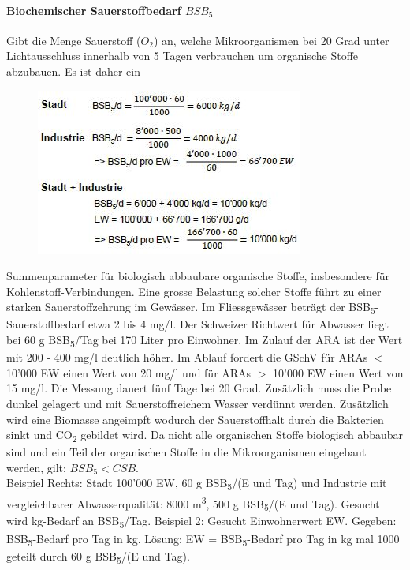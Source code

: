 \documentclass[9pt, openright=false]{scrartcl}
\begin{document}
\paragraph{Biochemischer Sauerstoffbedarf $BSB_5$} Gibt die Menge Sauerstoff ($O_2$) an, welche Mikroorganismen bei 20 Grad unter Lichtausschluss innerhalb von 5 Tagen verbrauchen um organische Stoffe abzubauen. Es ist daher ein\begin{figure} 
  \includegraphics[width=.5\textwidth]{images/AufgabeBSB}
\end{figure} Summenparameter für biologisch abbaubare organische Stoffe, insbesondere für Kohlenstoff-Verbindungen. Eine grosse Belastung solcher Stoffe führt zu einer starken Sauerstoffzehrung im Gewässer. Im Fliessgewässer beträgt der BSB\textsubscript{5}-Sauerstoffbedarf etwa 2 bis 4 mg/l. Der Schweizer Richtwert für Abwasser liegt bei 60 g BSB\textsubscript{5}/Tag bei 170 Liter pro Einwohner. Im Zulauf der ARA ist der Wert mit 200 - 400 mg/l deutlich höher. Im Ablauf fordert die GSchV für ARAs $<$ 10'000 EW einen Wert von 20 mg/l und für ARAs $>$ 10'000 EW einen Wert von 15 mg/l. Die Messung dauert fünf Tage bei 20 Grad. Zusätzlich muss die Probe dunkel gelagert und mit Sauerstoffreichem Wasser verdünnt werden. Zusätzlich wird eine Biomasse angeimpft wodurch der Sauerstoffhalt durch die Bakterien sinkt und CO\textsubscript{2} gebildet wird. Da nicht alle organischen Stoffe biologisch abbaubar sind und ein Teil der organischen Stoffe in die Mikroorganismen eingebaut werden, gilt: $BSB_5 < CSB$. \\ Beispiel Rechts: Stadt 100'000 EW, 60 g BSB\textsubscript{5}/(E und Tag) und Industrie mit vergleichbarer Abwasserqualität: 8000 m\textsuperscript{3}, 500 g BSB\textsubscript{5}/(E und Tag). Gesucht wird kg-Bedarf an BSB\textsubscript{5}/Tag. Beispiel 2: Gesucht Einwohnerwert EW. Gegeben: BSB\textsubscript{5}-Bedarf pro Tag in kg. Lösung: EW = BSB\textsubscript{5}-Bedarf pro Tag in kg mal 1000 geteilt durch 60 g BSB\textsubscript{5}/(E und Tag).\\
\end{document}
